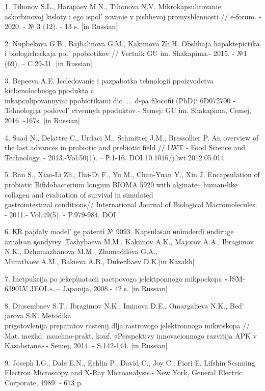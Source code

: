 \begin{references}
1. Tihonov S.L., Harapaev M.N., Tihonova N.V. Mikrokapsulirovanie
askorbinovoj kisloty i ego ispol' zovanie v pishhevoj
promyshlennosti // e-forum. - 2020. - № 3 (12). - 13 s. {[}in Russian{]}

2. Nupbekova G.B., Bajbalinova G.M., Kakimova Zh.H. Obshhaja
hapaktepictika i biologicheckaja pol'{} ppobiotikov //
Vectnik GU im. Shakapima.- 2015. - №1 (69). -- C.29-31. {[}in
Russian{]}

3. Bepeeva A.E. Iccledovanie i pazpabotka tehnologii ppoizvodctva
kiclomolochnogo ppodukta c \\inkapculipovannymi ppobiotikami dic. ... d-pa
filocofii (PhD): 6D072700 - Tehnologija podovol' ctvennyh
ppoduktov.- Semej: GU im. Shakapima, Cemej, 2016. -167s. {[}in
Russian{]}

4. Saad N., Delattre C., Urdaci M., Schmitter J.M., Bressollier P. An
overview of the last advances in probiotic and prebiotic field // LWT -
Food Science and Technology. - 2013.-Vol.50(1). -- Р.1-16. DOI
10.1016/j.lwt.2012.05.014

5. Ran S., Xiao-Li Zh., Dai-Di F., Yu M., Chan-Yuan Y., Xin J.
Encapsulation of probiotic Bifidobacterium longum BIOMA 5920 with
alginate-- human-like collagen and evaluation of survival in simulated\\
gastrointestinal conditions// International Journal of Biological
Macromolecules. - 2011.- Vol.49(5). - P.979-984.
DOI~

6. ҚR pajdaly model' ge patentі № 9093. Kapsulaғan
өnіmderdі өndіruge arnalғan қondyrғy. Tashybaeva M.M., Kakimov A.K.,
Majorov A.A., Ibragimov N.K., Dzhumazhanova M.M., Zhumadilova G.A.,\\
Muratbaev A.M., Bakieva A.B., Dukenbaev D.K.{[}in Kazakh{]}

7. Inctpukcija po jekcpluatacii pactpovogo jelektponnogo mikpockopa
«JSM-6390LV JEOL». -- Japonija, 2008.- 42 s. {[}in Russian{]}

8. Djusembaev S.T., Ibragimov N.K., Iminova D.E., Omargalieva N.K.,
Bed' jarova S.K. Metodika \\prigotovlenija preparatov
rastenij dlja rastrovogo jelektronnogo mikroskopa // Mat. mezhd.
nauchno-prakt. konf. «Perspektivy innovacionnogo razvitija APK v
Kazahstane».- Semej, 2014. - S.142-144. {[}in Russian{]}

9. Joseph I.G., Dale E.N., Echlin P., David C., Joy C., Fiori E. Lifshin
Scsnning Electron Microscopy and X-Ray Microanalysis.- New York, General
Electric Corporate, 1989. - 673 p.


\end{references}
